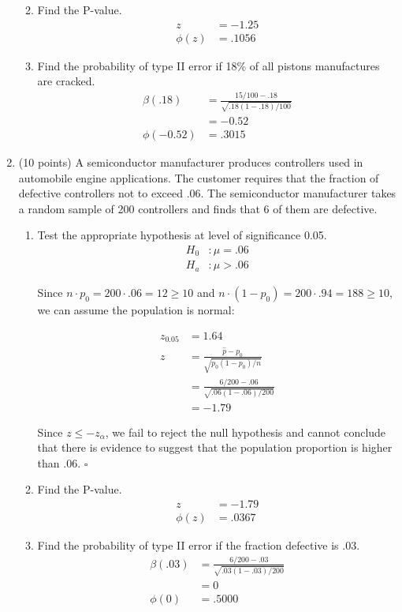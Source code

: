 \documentclass[12pt, letter]{article}
\newenvironment{nscenter}
	{\parskip=0pt\par\nopagebreak\centering}
	{\par\noindent\ignorespacesafterend}
\begin{document}
\begin{enumerate}
\begin{enumerate}
\begin{nscenter}
		\end{nscenter}
		\item Find the P-value.
		\begin{align*}
			z &= -1.25 \\
			\phi(z) &= \boxed{.1056}
		\end{align*}
		\item Find the probability of type II error if 18\% of all pistons manufactures are cracked.
		\begin{align*}
			\beta(.18) &= \frac{15/100 - .18}{\sqrt{.18(1-.18) / 100}} \\
			&= -0.52 \\
			\phi(-0.52) &= \boxed{.3015}
		\end{align*}
	\end{enumerate}
	\setcounter{enumi}{15}
	\item (10 points) A semiconductor manufacturer produces controllers used in automobile engine applications. The customer requires that the fraction of defective controllers not to exceed .06.  The semiconductor manufacturer takes a random sample of 200 controllers and finds that 6 of them are defective.
	\begin{enumerate}
		\item Test the appropriate hypothesis at level of significance 0.05.
		\pagebreak
		\begin{align*}
			H_{0}&: \mu = .06 \\
			H_{a}&: \mu > .06
		\end{align*}
		\begin{nscenter}
			Since $n \cdot p_{0} = 200 \cdot .06 = 12 \geq 10$ and $n \cdot (1-p_{0}) = 200 \cdot .94 = 188 \geq 10$, we can assume the population is normal:
		\end{nscenter}
		\begin{align*}
			z_{0.05} &= 1.64 \\
			z &= \frac{\hat{p} - p_{0}}{\sqrt{p_{0}(1-p_{0}) / n}} \\
			&= \frac{6/200 - .06}{\sqrt{.06(1-.06) / 200}} \\
			&= -1.79
		\end{align*}
		\begin{nscenter}
			Since $z \leq -z_{\alpha}$, we fail to reject the null hypothesis and cannot conclude that there is evidence to suggest that the population proportion is higher than .06. $\square$
		\end{nscenter}
		\item Find the P-value.
		\begin{align*}
			z &= -1.79 \\
			\phi(z) &= \boxed{.0367}
		\end{align*}
		\item Find the probability of type II error if the fraction defective is .03.
		\begin{align*}
			\beta(.03) &= \frac{6/200 - .03}{\sqrt{.03(1-.03) / 200}} \\
			&= 0 \\
			\phi(0) &= \boxed{.5000}
		\end{align*}
	\end{enumerate}
\end{enumerate}
\end{document}
